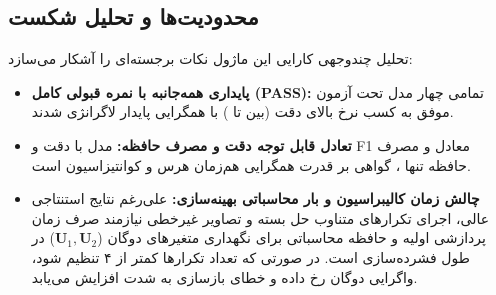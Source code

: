 \subsection{محدودیت‌ها و تحلیل شکست}
تحلیل چندوجهی کارایی این ماژول نکات برجسته‌ای را آشکار می‌سازد:
\begin{itemize}
\item \textbf{پایداری همه‌جانبه با نمره قبولی کامل (PASS):} تمامی چهار مدل تحت آزمون موفق به کسب نرخ بالای دقت (بین  تا ) با همگرایی پایدار لاگرانژی شدند.
\item \textbf{تعادل قابل توجه دقت و مصرف حافظه:} مدل  با دقت  و F1 معادل  و مصرف حافظه تنها ، گواهی بر قدرت همگرایی هم‌زمان هرس و کوانتیزاسیون است.
\item \textbf{چالش زمان کالیبراسیون و بار محاسباتی بهینه‌سازی:} علی‌رغم نتایج استنتاجی عالی، اجرای تکرارهای متناوب حل بسته و تصاویر غیرخطی نیازمند صرف زمان پردازشی اولیه و حافظه محاسباتی برای نگهداری متغیرهای دوگان ($\mathbf{U}_1, \mathbf{U}_2$) در طول فشرده‌سازی است. در صورتی که تعداد تکرارها کمتر از ۴ تنظیم شود، واگرایی دوگان رخ داده و خطای بازسازی به شدت افزایش می‌یابد.
\end{itemize}
